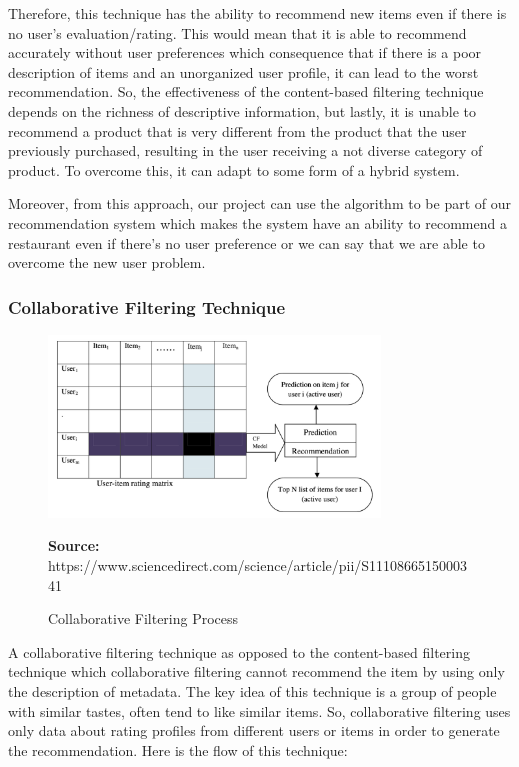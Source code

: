 \documentclass[12pt,oneside,openright,a4paper]{cpe-english-project}
\newcommand*{\captionsource}[2]{%
  \caption[{#1}]{#1}\vspace{-8pt}
  \textbf{Source:} #2}
\begin{document}
Therefore, this technique has the ability to recommend new items even if there is no user’s evaluation/rating. This would mean that it is able to recommend accurately without user preferences which consequence that if there is a poor description of items and an unorganized user profile, it can lead to the worst recommendation. So, the effectiveness of the content-based filtering technique depends on the richness of descriptive information, but lastly, it is unable to recommend a product that is very different from the product that the user previously purchased, resulting in the user receiving a not diverse category of product. To overcome this, it can adapt to some form of a hybrid system.

Moreover, from this approach, our project can use the algorithm to be part of our recommendation system which makes the system have an ability to recommend a restaurant even if there’s no user preference or we can say that we are able to overcome the new user problem.


\subsubsection{Collaborative Filtering Technique}

\begin{figure}[!h]\centering
\includegraphics[width=250pt]{./images/2cfprocess.png}
\label{fig:2cfprocess}
\captionsource{Collaborative Filtering Process}{https://www.sciencedirect.com/science/article/pii/S1110866515000341}
\end{figure}

A collaborative filtering technique as opposed to the content-based filtering technique which collaborative filtering cannot recommend the item by using only the description of metadata. The key idea of this technique is a group of people with similar tastes, often tend to like similar items. So, collaborative filtering uses only data about rating profiles from different users or items in order to generate the recommendation. Here is the flow of this technique:
\end{document}
